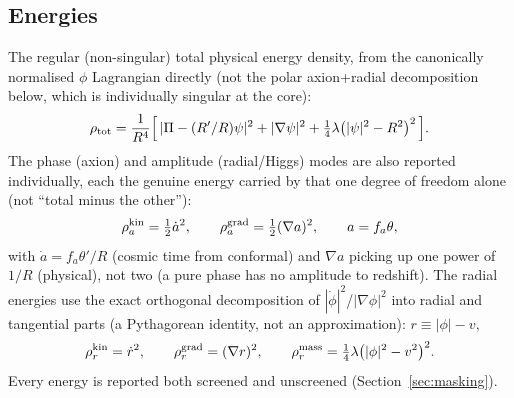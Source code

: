 \documentclass[11pt]{article}
\newcommand{\psivec}{\psi}
\begin{document}
\subsection{Energies}
\label{sec:energies}
The regular (non-singular) total physical energy density, from the canonically normalised $\phi$
Lagrangian directly (not the polar axion+radial decomposition below, which is individually singular at the
core):
\[
\rho_{\rm tot} = \frac{1}{R^4}\Big[\,|\Pi - (R'/R)\psivec|^2 + |\nabla\psivec|^2 +
\tfrac14\lambda\big(|\psivec|^2-R^2\big)^2\,\Big].
\]
The phase (axion) and amplitude (radial/Higgs) modes are also reported individually, each the genuine
energy carried by that one degree of freedom alone (not ``total minus the other''):
\[
\rho_a^{\rm kin} = \tfrac12\dot a^2,\qquad \rho_a^{\rm grad} = \tfrac12(\nabla a)^2, \qquad a = f_a\theta,
\]
with $\dot a = f_a\theta'/R$ (cosmic time from conformal) and $\nabla a$ picking up one power of $1/R$
(physical), not two (a pure phase has no amplitude to redshift). The radial energies use the exact
orthogonal decomposition of $|\dot\phi|^2$/$|\nabla\phi|^2$ into radial and tangential parts (a Pythagorean
identity, not an approximation): $r\equiv|\phi|-v$,
\[
\rho_r^{\rm kin} = \dot r^2, \qquad \rho_r^{\rm grad} = (\nabla r)^2, \qquad
\rho_r^{\rm mass} = \tfrac14\lambda\big(|\phi|^2-v^2\big)^2.
\]
Every energy is reported both screened and unscreened (Section~\ref{sec:masking}).
\end{document}
